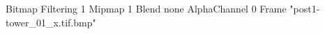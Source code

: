 {Bitmap
	{Filtering 1}
	{Mipmap 1}
	{Blend none}
	{AlphaChannel 0}
	{Frame "post1-tower_01_x.tif.bmp"}
}
